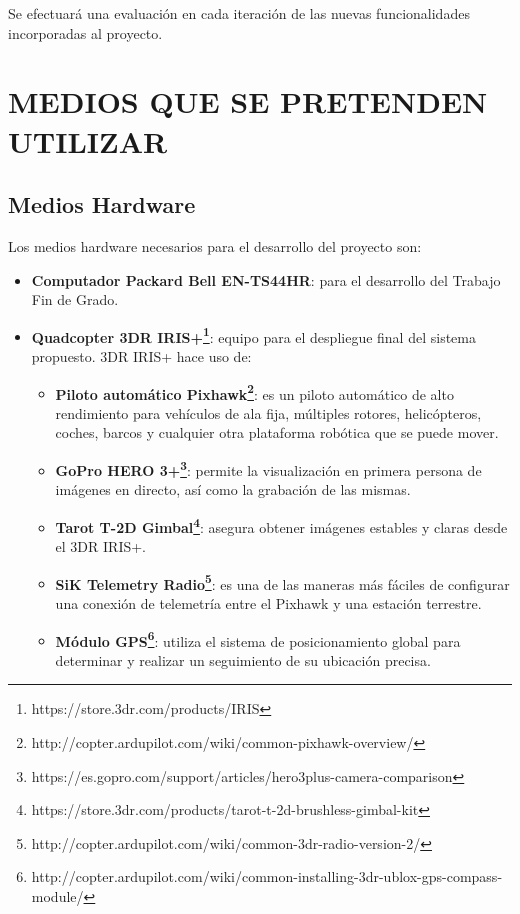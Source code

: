 \documentclass{pre-tfg}
\begin{document}
Se efectuará una evaluación en cada iteración de las nuevas funcionalidades incorporadas al proyecto.

\section{MEDIOS QUE SE PRETENDEN UTILIZAR}

\subsection{Medios Hardware}
Los medios hardware necesarios para el desarrollo del proyecto son:

\begin{itemize}
\item \textbf{Computador Packard Bell EN-TS44HR}: para el desarrollo del Trabajo Fin de Grado.
\item \textbf{Quadcopter 3DR IRIS+\footnote{https://store.3dr.com/products/IRIS}}: equipo para el despliegue final del sistema propuesto. 3DR IRIS+ hace uso de:

\begin{itemize}
\item \textbf{Piloto automático Pixhawk\footnote{http://copter.ardupilot.com/wiki/common-pixhawk-overview/}}: es un piloto automático de alto rendimiento para vehículos de ala fija, múltiples rotores, helicópteros, coches, barcos y cualquier otra plataforma robótica que se puede mover.
\item \textbf{GoPro HERO 3+\footnote{https://es.gopro.com/support/articles/hero3plus-camera-comparison}}: permite la visualización en primera persona de imágenes en directo, así como la grabación de las mismas.
\item \textbf{Tarot T-2D Gimbal\footnote{https://store.3dr.com/products/tarot-t-2d-brushless-gimbal-kit}}: asegura obtener imágenes estables y claras desde el 3DR IRIS+.
\item \textbf{SiK Telemetry Radio\footnote{http://copter.ardupilot.com/wiki/common-3dr-radio-version-2/}}: es una de las maneras más fáciles de configurar una conexión de telemetría entre el Pixhawk y una estación terrestre.
\item \textbf{Módulo GPS\footnote{http://copter.ardupilot.com/wiki/common-installing-3dr-ublox-gps-compass-module/}}: utiliza el sistema de posicionamiento global para determinar y realizar un seguimiento de su ubicación precisa.
\end{itemize}

\end{itemize}
\end{document}
